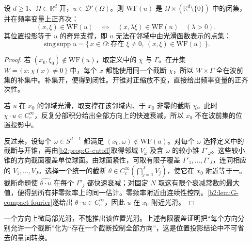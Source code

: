 \begin{proposition}\label{b2:prop:G-wavefront-geometry}
设 \(d\ge1\)、\(\Omega\subset\mathbb R^d\) 开，\(u\in\mathcal D'(\Omega)\)。则 \(\mathrm{WF}(u)\) 是 \(\Omega\times(\mathbb R^d\setminus\{0\})\) 中的闭集，并在频率变量上正齐次：
\[
 (x,\xi)\in\mathrm{WF}(u)
 \quad\Longleftrightarrow\quad
 (x,\lambda\xi)\in\mathrm{WF}(u)
 \quad(\lambda>0).
\]
其位置投影等于 \(u\) 的奇异支撑，即 \(u\) 无法在邻域中由光滑函数表示的点集：
\[
 \operatorname{sing\,supp}u
 =\{\,x\in\Omega:\text{存在 }\xi\ne0,
                     \ (x,\xi)\in\mathrm{WF}(u)\,\}.
\]
\end{proposition}
\begin{proof}
若 \((x_0,\xi_0)\notin\mathrm{WF}(u)\)，取定义中的 \(\chi\) 与 \(\Gamma\)。在开集 \(W=\{\,x:\chi(x)\ne0\,\}\) 中，每个 \(x\) 都能使用同一个截断 \(\chi\)，所以 \(W\times\Gamma\) 全在波前集的补集中。补集开，便得到闭性。开锥对正缩放不变，直接给出频率变量的正齐次性。

若 \(u\) 在 \(x_0\) 的邻域光滑，取支撑在该邻域内、于 \(x_0\) 非零的截断 \(\chi\)。此时 \(\chi\cdot u\in C_c^\infty\)，反复分部积分给出全部方向上的快速衰减，所以 \(x_0\) 不在波前集的位置投影中。

反过来，设每个 \(\omega\in S^{d-1}\) 都满足
\((x_0,\omega)\notin\mathrm{WF}(u)\)。对每个 \(\omega\) 选择定义中的截断与开锥，再由\cref{b2:prop:G-cutoff}取得邻域 \(V_\omega\) 及含 \(\omega\) 的较小锥 \(\Gamma'_\omega\)。这些较小锥的方向截面覆盖单位球面。由球面紧性，可取有限子覆盖 \(\Gamma'_1,\ldots,\Gamma'_J\)，连同相应的 \(V_1,\ldots,V_J\)。选择一个统一的截断
\(\theta\in C_c^\infty(\bigcap_{j=1}^J V_j)\)，使它在 \(x_0\) 附近等于一。截断命题使 \(\widehat{\theta\cdot u}\) 在每个 \(\Gamma'_j\) 都快速衰减；对固定 \(N\) 取这有限个衰减常数的最大值，便得到所有非零频率上的同一估计。零频率附近由连续性控制。\cref{b2:lem:G-compact-fourier}遂给出 \(\theta\cdot u\in C_c^\infty\)，因此 \(u\) 在 \(x_0\) 附近光滑。
\end{proof}

一个方向上微局部光滑，不能推出该位置光滑。上述有限覆盖证明把“每个方向分别允许一个截断”化为“存在一个截断控制全部方向”，这是位置投影结论中不可省去的量词转换。

